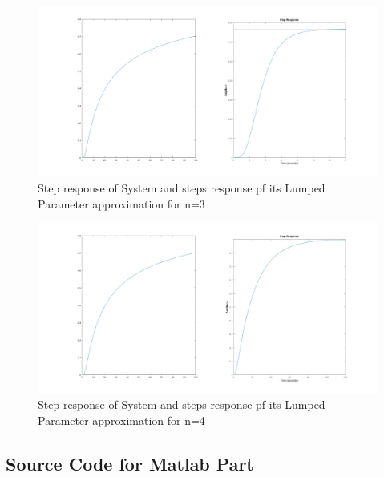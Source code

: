 \documentclass[a4paper,12pt]{article}
\begin{document}
\begin{enumerate}
					
					\begin{figure}[H]
						\center
						\setlength{\unitlength}{\textwidth} 
						\includegraphics[width=0.9\unitlength]{images/3c}
						\caption{\label{fig:pre2c}  Step response of System and steps response pf its Lumped Parameter approximation for n=3}
					\end{figure}
					
					
					\begin{figure}[H]
						\center
						\setlength{\unitlength}{\textwidth} 
						\includegraphics[width=0.9\unitlength]{images/3d}
						\caption{\label{fig:pre2c}  Step response of System and steps response pf its Lumped Parameter approximation for n=4}
					\end{figure}
			
		\end{enumerate}
		
		

	
\begin{appendices}
\section{Source Code for Matlab Part}\label{appendix}
 
\end{appendices}
\end{document}
